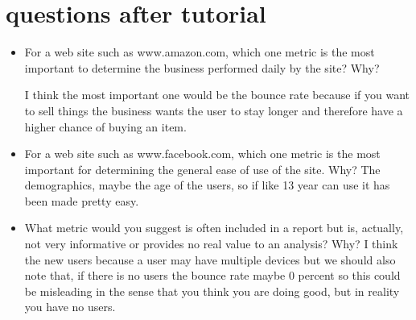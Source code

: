 \documentclass{article}
\begin{document}
\newpage
\section{questions after tutorial}
\begin{itemize}
    \item For a web site such as www.amazon.com, which one metric is the most important to determine the business performed daily by the site? Why? 
    
    I think the most important one would be the bounce rate because if you want to sell things the business wants the user to stay longer and therefore have a higher chance of buying an item. 
    
\item For a web site such as www.facebook.com, which one metric is the most important for determining the general ease of use of the site. Why?
The demographics, maybe the age of the users, so if like 13 year can use it has been made pretty easy. 

\item What metric would you suggest is often included in a report but is, actually, not very informative or provides no real value to an analysis? Why?
I think the new users because a user may have multiple devices but we should also note that, if there is no users the bounce rate maybe 0 percent so this could be misleading in the sense that you think you are doing good, but in reality you have no users.  

\end{itemize}
\end{document}
